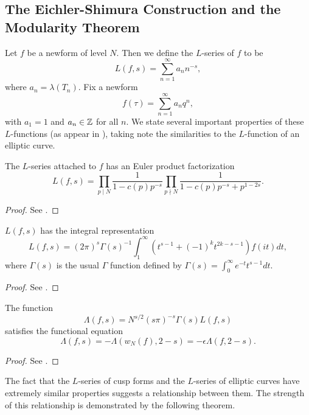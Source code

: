 \subsection{The Eichler-Shimura Construction and the Modularity Theorem}
Let $f$ be a newform of level $N$. Then we define the $L$-series of $f$ to be
$$L(f,s) = \sum_{n=1}^\infty a_nn^{-s},$$
where $a_n = \lambda(T_n)$. Fix a newform 
$$f(\tau) = \sum_{n=1}^\infty a_nq^n,$$
with $a_1 = 1$ and $a_n \in \mathbb{Z}$ for all $n$. We state several important properties of these $L$-functions (as appear in \cite[Section 2.4]{Darmon2}), taking note the similarities to the $L$-function of an elliptic curve.
\begin{prop} The $L$-series attached to $f$ has an Euler product factorization 
$$L(f,s) = \prod_{p\mid N}\frac{1}{1-c(p)p^{-s}}\prod_{p\nmid N}\frac{1}{1-c(p)p^{-s} + p^{1-2s}}.$$
\end{prop}
\begin{proof}
See \cite[Page 282]{Knapp}.
\end{proof}

\begin{prop} $L(f,s)$ has the integral representation
$$L(f,s) = (2\pi)^s\Gamma(s)^{-1}\int_1^\infty (t^{s-1}+(-1)^kt^{2k-s-1})f(it)dt,$$
where $\Gamma(s)$ is the usual $\Gamma$ function defined by $\Gamma(s) = \int_0^\infty e^{-t}t^{s-1}dt$.
\end{prop}
\begin{proof}
See \cite[Page 84]{Silverman1}.
\end{proof}

\begin{prop} The function
$$\Lambda(f,s) = N^{s/2}(s\pi)^{-s}\Gamma(s)L(f,s)$$ 
satisfies the functional equation
$$\Lambda(f,s) = -\Lambda(w_N(f),2-s) = -\epsilon\Lambda(f,2-s).$$
\end{prop}
\begin{proof}
See \cite[Page 270]{Knapp}.
\end{proof}

The fact that the $L$-series of cusp forms and the $L$-series of elliptic curves have extremely similar properties suggests a relationship between them. The strength of this relationship is demonstrated by the following theorem.

